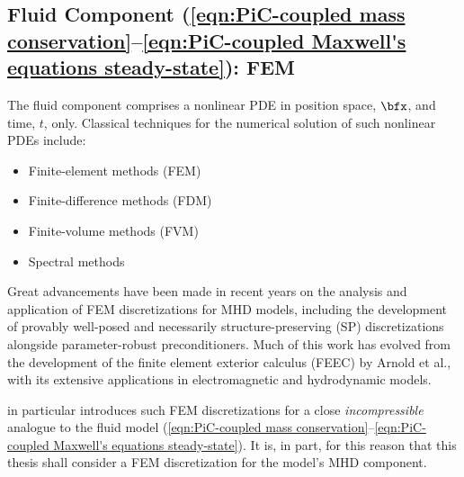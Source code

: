 \subsection*{Fluid Component (\ref{eqn:PiC-coupled mass conservation}--\ref{eqn:PiC-coupled Maxwell's equations steady-state}): FEM}
    The fluid component comprises a nonlinear PDE in position space, $\bfx$, and time, $t$, only. Classical techniques for the numerical solution of such nonlinear PDEs include:
    \begin{itemize}
        \item  Finite-element methods (FEM)
        \item  Finite-difference methods (FDM)
        \item  Finite-volume methods (FVM)
        \item  Spectral methods
    \end{itemize}
    Great advancements have been made in recent years on the analysis and application of FEM discretizations for MHD models, including the development of provably well-posed and necessarily structure-preserving (SP) discretizations alongside parameter-robust preconditioners. \cite{Hu_Xu_2015, Hu_Ma_Xu_2017, Hu_Lee_Xu_2021, Green_et_al_2022, Laakmann_Farrell_Mitchell_22, Laakmann_Hu_Farrell_2022} Much of this work has evolved from the development of the finite element exterior calculus (FEEC) by Arnold et al., with its extensive applications in electromagnetic and hydrodynamic models. \cite{Arnold_Falk_Winther_2006, Arnold_Falk_Winther_2009, Arnold_2018}
    
    \cite{Laakmann_Hu_Farrell_2022} in particular introduces such FEM discretizations for a close \emph{incompressible} analogue to the fluid model (\ref{eqn:PiC-coupled mass conservation}--\ref{eqn:PiC-coupled Maxwell's equations steady-state}). It is, in part, for this reason that this thesis shall consider a FEM discretization for the model's MHD component.
    